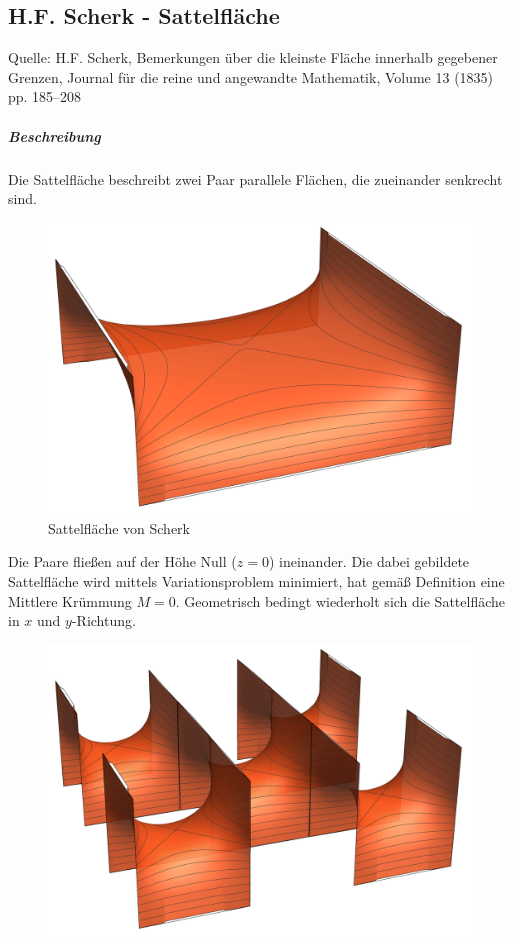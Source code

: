 \begin{refsection}
\subsection{H.F. Scherk - Sattelfläche}
Quelle: H.F. Scherk, Bemerkungen über die kleinste Fläche innerhalb gegebener Grenzen, Journal für die reine und angewandte Mathematik, Volume 13 (1835) pp. 185–208
\subparagraph{Beschreibung}
Die Sattelfläche beschreibt zwei Paar parallele Flächen, die zueinander senkrecht sind.
\begin{figure}[H]
  \centering
  \includegraphics[scale=0.2]{minimal/HFSherk.png}
  \caption{Sattelfläche von Scherk} 
\end{figure}
Die Paare fließen auf der Höhe Null ($z=0$) ineinander. Die dabei gebildete Sattelfläche wird mittels Variationsproblem minimiert, hat gemäß Definition eine Mittlere Krümmung $M=0$. Geometrisch bedingt wiederholt sich die Sattelfläche in $x$ und $y$-Richtung.
\begin{figure}[H]
  \centering
  \includegraphics[scale=0.2]{minimal/HFSherk2.png}

\end{figure}
\end{refsection}
